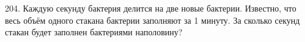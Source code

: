 204. Каждую секунду бактерия делится на две новые бактерии. Известно, что весь объём одного стакана бактерии заполняют за 1 минуту. За сколько секунд стакан будет заполнен бактериями наполовину?\\
